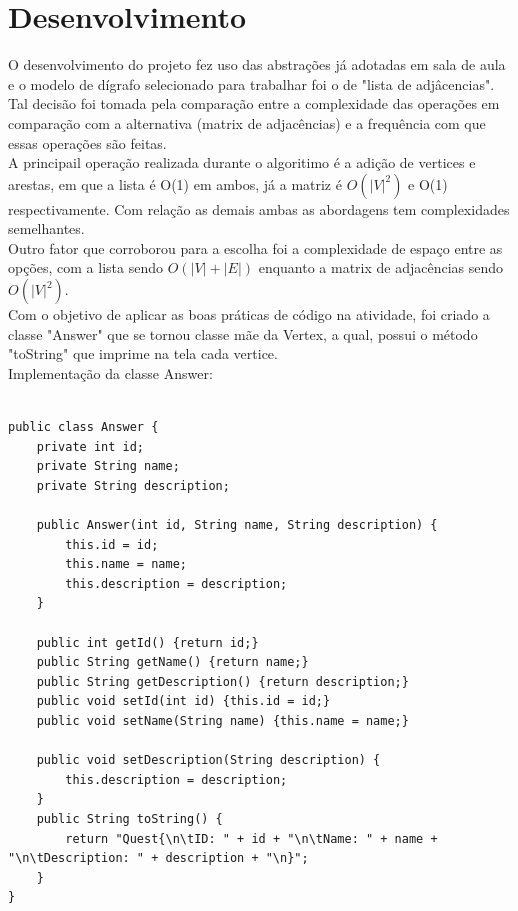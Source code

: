 \documentclass[a4paper, 12pt]{article}
\begin{document}
\newpage
\section{Desenvolvimento}

O desenvolvimento do projeto fez uso das abstrações já adotadas em sala de aula e o modelo de dígrafo selecionado para trabalhar foi o de "lista de adjâcencias".\\
Tal decisão foi tomada pela comparação entre a complexidade das operações em comparação com a alternativa (matrix de adjacências) e a frequência com que essas operações são feitas.\\
A principail operação realizada durante o algoritimo é a adição de vertices e arestas, em que a lista é O(1) em ambos, já a matriz é $O(|V|^2)$ e O(1) respectivamente. Com relação as demais ambas as abordagens tem complexidades semelhantes.\\
Outro fator que corroborou para a escolha foi a complexidade de espaço entre as opções, com a lista sendo $O(|V|+|E|)$ enquanto a matrix de adjacências sendo $O(|V|^2)$.\\
Com o objetivo de aplicar as boas práticas de código na atividade, foi criado a classe "Answer" que se tornou classe mãe da Vertex, a qual, possui o método "toString" que imprime na tela cada vertice.\\

Implementação da classe Answer:

\begin{verbatim}

public class Answer {
    private int id;
    private String name;
    private String description;
    
    public Answer(int id, String name, String description) {
        this.id = id;
        this.name = name;
        this.description = description;
    }
    
    public int getId() {return id;}
    public String getName() {return name;}
    public String getDescription() {return description;}
    public void setId(int id) {this.id = id;}
    public void setName(String name) {this.name = name;}
    
    public void setDescription(String description) {
        this.description = description;
    }
    public String toString() {
        return "Quest{\n\tID: " + id + "\n\tName: " + name + "\n\tDescription: " + description + "\n}";
    }
}


\end{verbatim}
\end{document}
